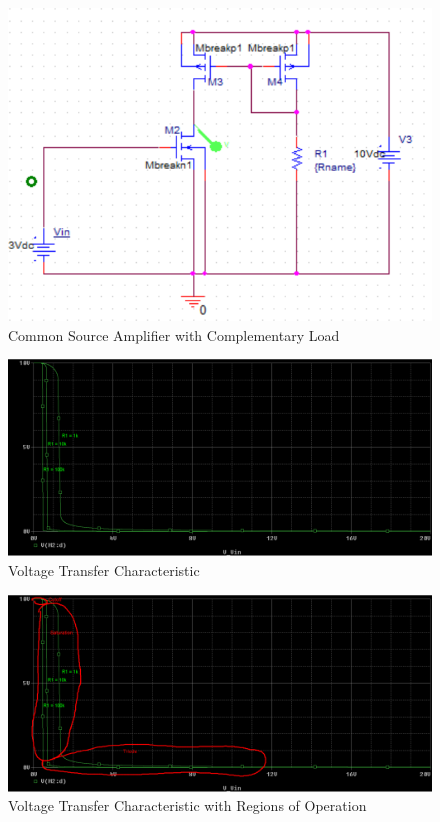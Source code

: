 \FloatBarrier

\begin{figure}[h!]
	\centering
	\includegraphics[scale=0.75]{../images/circuit5.PNG}
	\caption{Common Source Amplifier with Complementary Load}
	\label{fig:circuit5}
\end{figure}

\FloatBarrier

\FloatBarrier

\begin{figure}[h!]
	\centering
	\includegraphics[scale=0.75]{../images/dc_sweep_vin.PNG}
	\caption{Voltage Transfer Characteristic}
	\label{fig:dc_sweep_vin}
\end{figure}

\FloatBarrier

\FloatBarrier

\begin{figure}[h!]
	\centering
	\includegraphics[scale=0.75]{../images/dc_sweep_vin_labeled.PNG}
	\caption{Voltage Transfer Characteristic with Regions of Operation}
	\label{fig:dc_sweep_vin_labeled}
\end{figure}

